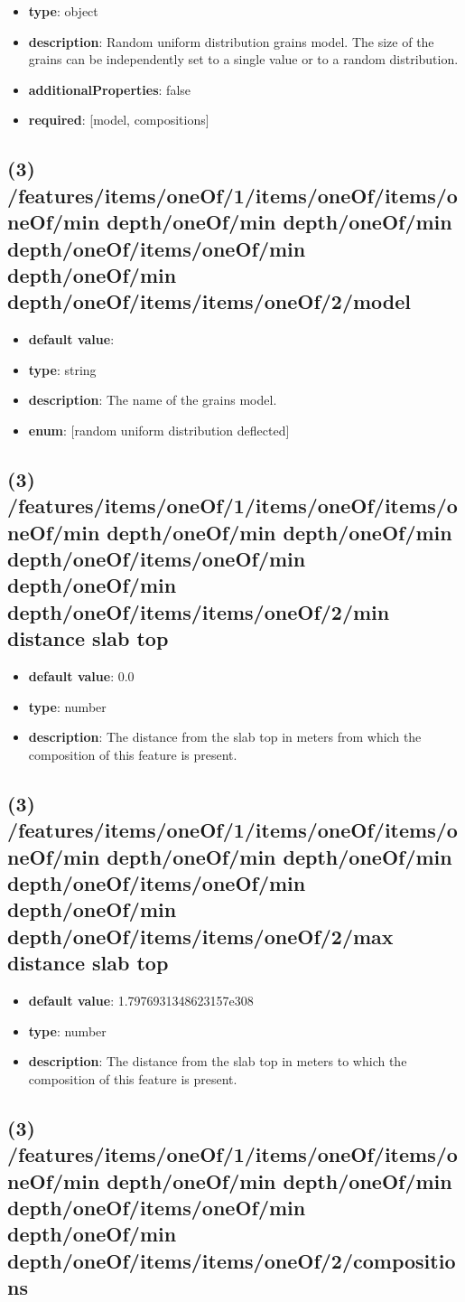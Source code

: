\begin{itemize}[leftmargin=2em]\item {\bf type}: object
\item {\bf description}: Random uniform distribution grains model. The size of the grains can be independently set to a single value or to a random distribution.
\item {\bf additionalProperties}: false
\item {\bf required}: [model, compositions]\end{itemize}
\subsection{(3) /features/items/oneOf/1/items/oneOf/items/oneOf/min depth/oneOf/min depth/oneOf/min depth/oneOf/items/oneOf/min depth/oneOf/min depth/oneOf/items/items/oneOf/2/model}
\begin{itemize}[leftmargin=3em]\item {\bf default value}: 
\item {\bf type}: string
\item {\bf description}: The name of the grains model.
\item {\bf enum}: [random uniform distribution deflected]\end{itemize}\subsection{(3) /features/items/oneOf/1/items/oneOf/items/oneOf/min depth/oneOf/min depth/oneOf/min depth/oneOf/items/oneOf/min depth/oneOf/min depth/oneOf/items/items/oneOf/2/min distance slab top}
\begin{itemize}[leftmargin=3em]\item {\bf default value}: 0.0
\item {\bf type}: number
\item {\bf description}: The distance from the slab top in meters from which the composition of this feature is present.
\end{itemize}\subsection{(3) /features/items/oneOf/1/items/oneOf/items/oneOf/min depth/oneOf/min depth/oneOf/min depth/oneOf/items/oneOf/min depth/oneOf/min depth/oneOf/items/items/oneOf/2/max distance slab top}
\begin{itemize}[leftmargin=3em]\item {\bf default value}: 1.7976931348623157e308
\item {\bf type}: number
\item {\bf description}: The distance from the slab top in meters to which the composition of this feature is present.
\end{itemize}\subsection{(3) /features/items/oneOf/1/items/oneOf/items/oneOf/min depth/oneOf/min depth/oneOf/min depth/oneOf/items/oneOf/min depth/oneOf/min depth/oneOf/items/items/oneOf/2/compositions}
